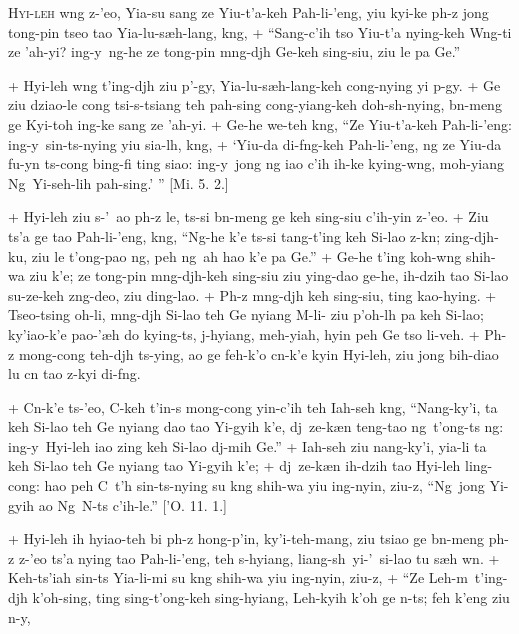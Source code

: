 \header
\lettrine{H}{yi-leh} w\oo ng z-'eo, Yia-su sang ze Yiu-t'a-keh Pah-li-'eng,
yiu kyi-ke p\oo h-z jong tong-pin tseo tao Yia-lu-s\ae h-lang, k\oo ng,
+	``Sang-c'ih tso Yiu-t'a nying-keh W\oo ng-ti ze 'ah-yi? ing-y\y\ ng\oo-he ze tong-pin m\oo ng-dj\oo h
	Ge-keh sing-siu, ziu le pa Ge.''
\par
+	Hyi-leh w\oo ng t'ing-dj\oo h ziu p'\oo-gy\y, Yia-lu-s\ae h-lang-keh cong-nying yi p\oo-gy\y.
+	Ge ziu dziao-le cong tsi-s-tsiang teh pah-sing cong-yiang-keh doh-sh\y-nying, b\e n-meng ge Kyi-toh ing-ke
	sang ze 'ah-yi.
+	Ge-he we-teh k\oo ng, ``Ze Yiu-t'a-keh Pah-li-'eng: ing-y\y\ sin-ts-nying yiu sia-l\oo h, k\oo ng,
+	`Yiu-da di-f\oo ng-keh Pah-li-'eng, ng ze Yiu-da fu-y\y n ts-cong bing-fi ting siao: ing-y\y\ jong ng iao
	c'ih ih-ke ky\y ing-w\oo ng, moh-yiang Ng\oo\ Yi-seh-lih pah-sing.' '' [Mi. 5. 2.]
\par
+	Hyi-leh ziu s-'\oo\ ao p\oo h-z le, ts-si b\e n-meng ge keh sing-siu c'ih-yin z-'eo.
+	Ziu ts'a ge tao Pah-li-'eng, k\oo ng, ``Ng-he k'e ts-si tang-t'ing keh Si-lao z-k\e n; zing-dj\oo h-ku,
	ziu le t'ong-pao ng\oo, peh ng\oo\ ah hao k'e pa Ge.''
+	Ge-he t'ing koh-w\oo ng shih-wa ziu k'e; ze tong-pin m\oo ng-dj\oo h-keh sing-siu ziu ying-dao ge-he,
	ih-dzih tao Si-lao su-ze-keh z\oo ng-deo, ziu ding-lao.
+	P\oo h-z m\oo ng-dj\oo h keh sing-siu, ting kao-hying.
+	Tseo-tsing oh-li, m\oo ng-dj\oo h Si-lao teh Ge nyiang M\oo-li-\oo\; ziu p'oh-l\oo h pa keh Si-lao;
	ky'iao-k'e pao-'\ae h do kying-ts, j\y-hyiang, meh-yiah, hyin peh Ge tso li-veh.
+	P\oo h-z mong-cong teh-dj\oo h ts-ying, ao ge feh-k'o c\y n-k'e kyin Hyi-leh, ziu jong bih-diao lu c\y n tao
	z-kyi di-f\oo ng.
\par
+	C\y n-k'e ts-'eo, C\y-keh t'in-s mong-cong yin-c'ih teh Iah-seh k\oo ng, ``Nang-ky'i, ta keh Si-lao teh Ge nyiang
	dao tao Yi-gyih k'e, dj\y\ ze-k\ae n teng-tao ng\oo\ t'ong-ts ng: ing-y\y\ Hyi-leh iao zing keh Si-lao dj\y-mih Ge.''
+	Iah-seh ziu nang-ky'i, yia-li ta keh Si-lao teh Ge nyiang tao Yi-gyih k'e;
+	dj\y\ ze-k\ae n ih-dzih tao Hyi-leh ling-cong: hao peh C\y\ t'\oo h sin-ts-nying su k\oo ng shih-wa yiu ing-nyin,
	ziu-z, ``Ng\oo\ jong Yi-gyih ao Ng\oo\ N-ts c'ih-le.'' ['O. 11. 1.]
\par
+	Hyi-leh ih hyiao-teh bi p\oo h-z hong-p'in, ky'i-teh-mang, ziu tsiao ge b\e n-meng p\oo h-z z-'eo ts'a nying tao
	Pah-li-'eng, teh s-hyiang, liang-sh\y{}i-'\oo\ si-lao tu s\ae h w\e n.
+	Keh-ts'iah sin-ts Yia-li-mi su k\oo ng shih-wa yiu ing-nyin, ziu-z,
+	``Ze Leh-m\oo\ t'ing-dj\oo h k'oh-sing, ting sing-t'ong-keh sing-hyiang, Leh-kyih k'oh ge n-ts; feh k'eng ziu \e n-y\y,
